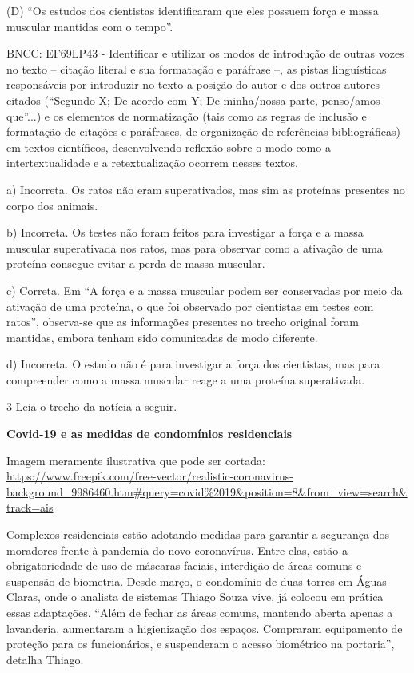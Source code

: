 \begin{itemize}
(D) ``Os estudos dos cientistas identificaram que eles possuem força e
massa muscular mantidas com o tempo''.

BNCC: EF69LP43 - Identificar e utilizar os modos de introdução de outras
vozes no texto -- citação literal e sua formatação e paráfrase --, as
pistas linguísticas responsáveis por introduzir no texto a posição do
autor e dos outros autores citados (``Segundo X; De acordo com Y; De
minha/nossa parte, penso/amos que''...) e os elementos de normatização
(tais como as regras de inclusão e formatação de citações e paráfrases,
de organização de referências bibliográficas) em textos científicos,
desenvolvendo reflexão sobre o modo como a intertextualidade e a
retextualização ocorrem nesses textos.

a) Incorreta. Os ratos não eram superativados, mas sim as proteínas
presentes no corpo dos animais.

b) Incorreta. Os testes não foram feitos para investigar a força e a
massa muscular superativada nos ratos, mas para observar como a ativação
de uma proteína consegue evitar a perda de massa muscular.

c) Correta. Em ``A força e a massa muscular podem ser conservadas por
meio da ativação de uma proteína, o que foi observado por cientistas em
testes com ratos'', observa-se que as informações presentes no trecho
original foram mantidas, embora tenham sido comunicadas de modo
diferente.

d) Incorreta. O estudo não é para investigar a força dos cientistas, mas
para compreender como a massa muscular reage a uma proteína
superativada.

\num{3} Leia o trecho da notícia a seguir.

\textbf{Covid-19 e as medidas de condomínios residenciais}

Imagem meramente ilustrativa que pode ser cortada:
\url{https://www.freepik.com/free-vector/realistic-coronavirus-background_9986460.htm\#query=covid\%2019\&position=8\&from_view=search\&track=ais}

Complexos residenciais estão adotando medidas para garantir a segurança
dos moradores frente à pandemia do novo coronavírus. Entre elas, estão a
obrigatoriedade de uso de máscaras faciais, interdição de áreas comuns e
suspensão de biometria. Desde março, o condomínio de duas torres em
Águas Claras, onde o analista de sistemas Thiago Souza vive, já colocou
em prática essas adaptações. ``Além de fechar as áreas comuns, mantendo
aberta apenas a lavanderia, aumentaram a higienização dos espaços.
Compraram equipamento de proteção para os funcionários, e suspenderam o
acesso biométrico na portaria'', detalha Thiago.


\end{itemize}
